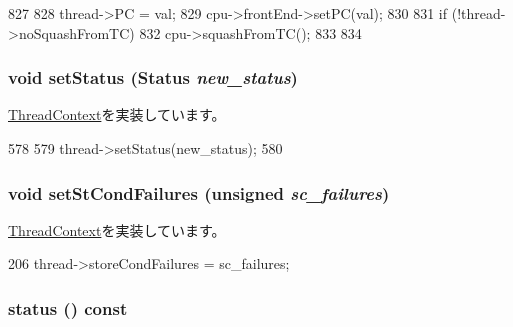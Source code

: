 \begin{DoxyCode}
827 {
828     thread->PC = val;
829     cpu->frontEnd->setPC(val);
830 
831     if (!thread->noSquashFromTC) {
832         cpu->squashFromTC();
833     }
834 }
\end{DoxyCode}
\hypertarget{classOzoneCPU_1_1OzoneTC_acdf331c877974ed8697216475a21998d}{
\subsubsection[{setStatus}]{\setlength{\rightskip}{0pt plus 5cm}void setStatus ({\bf Status} {\em new\_\-status})}}
\label{classOzoneCPU_1_1OzoneTC_acdf331c877974ed8697216475a21998d}


\hyperlink{classThreadContext_ab09e388dd57fd5b8e05da30473b0a859}{ThreadContext}を実装しています。


\begin{DoxyCode}
578 {
579     thread->setStatus(new_status);
580 }
\end{DoxyCode}
\hypertarget{classOzoneCPU_1_1OzoneTC_abbe779fa43c72cd485ddb736ab17ff61}{
\subsubsection[{setStCondFailures}]{\setlength{\rightskip}{0pt plus 5cm}void setStCondFailures (unsigned {\em sc\_\-failures})}}
\label{classOzoneCPU_1_1OzoneTC_abbe779fa43c72cd485ddb736ab17ff61}


\hyperlink{classThreadContext_aaa3506321089a0ec9c36d9ceff17c346}{ThreadContext}を実装しています。


\begin{DoxyCode}
206         { thread->storeCondFailures = sc_failures; }
\end{DoxyCode}
\hypertarget{classOzoneCPU_1_1OzoneTC_a2ad9e92a82d6f783b3061584729c2f4a}{
\subsubsection[{status}]{ status () const}}
\label{classOzoneCPU_1_1OzoneTC_a2ad9e92a82d6f783b3061584729c2f4a}


